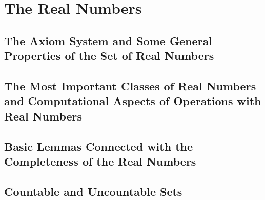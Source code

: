 \chapter{The Real Numbers}

\section{The Axiom System and Some General Properties of the Set
of Real Numbers}

\section{The Most Important Classes of Real Numbers and Computational Aspects of Operations with Real Numbers}

\section{Basic Lemmas Connected with the Completeness of the Real Numbers}

\section{Countable and Uncountable Sets}

